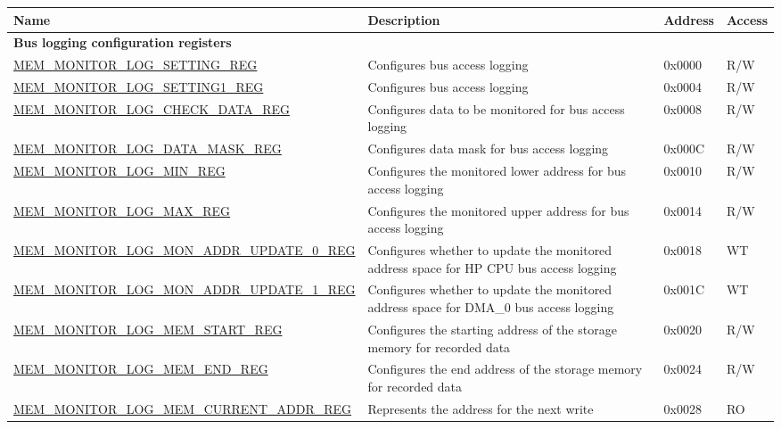 \begin{longtable}{ | l | m{13cm} | l | l | }
\hline\rowcolor{lightgray}
{\bfseries Name} & {\bfseries Description} &  {\bfseries Address} & {\bfseries Access} \\ \hline
\endhead
\multicolumn{4}{|l|}{\textbf{Bus logging configuration registers}} \\ \hline
\hyperref[regdesc:MEMMONITORLOGSETTINGREG]{MEM\_MONITOR\_LOG\_SETTING\_REG} & Configures bus access logging  & 0x0000 & R/W \\ \hline
\hyperref[regdesc:MEMMONITORLOGSETTING1REG]{MEM\_MONITOR\_LOG\_SETTING1\_REG} & Configures bus access logging & 0x0004 & R/W \\ \hline
\hyperref[regdesc:MEMMONITORLOGCHECKDATAREG]{MEM\_MONITOR\_LOG\_CHECK\_DATA\_REG} & Configures data to be monitored for bus access logging & 0x0008 & R/W \\ \hline
\hyperref[regdesc:MEMMONITORLOGDATAMASKREG]{MEM\_MONITOR\_LOG\_DATA\_MASK\_REG} & Configures data mask for bus access logging & 0x000C & R/W \\ \hline
\hyperref[regdesc:MEMMONITORLOGMINREG]{MEM\_MONITOR\_LOG\_MIN\_REG} & Configures the monitored lower address for bus access logging & 0x0010 & R/W \\ \hline
\hyperref[regdesc:MEMMONITORLOGMAXREG]{MEM\_MONITOR\_LOG\_MAX\_REG} & Configures the monitored upper address for bus access logging & 0x0014 & R/W \\ \hline
\hyperref[regdesc:MEMMONITORLOGMONADDRUPDATE0REG]{MEM\_MONITOR\_LOG\_MON\_ADDR\_UPDATE\_0\_REG} & Configures whether to update the monitored address space for HP CPU bus access logging & 0x0018 & WT \\ \hline
\hyperref[regdesc:MEMMONITORLOGMONADDRUPDATE1REG]{MEM\_MONITOR\_LOG\_MON\_ADDR\_UPDATE\_1\_REG} & Configures whether to update the monitored address space for DMA\_0 bus access logging & 0x001C & WT \\ \hline
\hyperref[regdesc:MEMMONITORLOGMEMSTARTREG]{MEM\_MONITOR\_LOG\_MEM\_START\_REG} & Configures the starting address of the storage memory for recorded data & 0x0020 & R/W \\ \hline
\hyperref[regdesc:MEMMONITORLOGMEMENDREG]{MEM\_MONITOR\_LOG\_MEM\_END\_REG} & Configures the end address of the storage memory for recorded data & 0x0024 & R/W \\ \hline
\hyperref[regdesc:MEMMONITORLOGMEMCURRENTADDRREG]{MEM\_MONITOR\_LOG\_MEM\_CURRENT\_ADDR\_REG} & Represents the address for the next write & 0x0028 & RO \\ \hline

\end{longtable}
